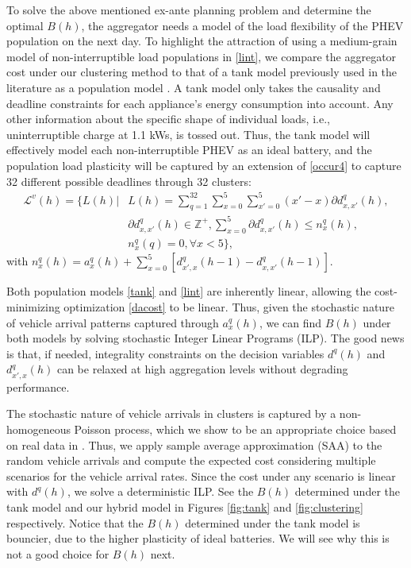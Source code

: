 \documentclass[10pt]{IEEEtran}
\begin{document}
To solve the above mentioned ex-ante planning problem and determine the optimal $B(h)$, the aggregator needs a model of the load flexibility of the PHEV population on the next day.
To highlight the attraction of using a medium-grain model of non-interruptible load populations in \eqref{lint}, we compare the aggregator cost under our clustering method to that of a  tank model previously used in the literature as a population model \cite{homer, 6426102,ortega}. A tank model only takes the causality and deadline constraints for each appliance's energy consumption into account. Any other information about the specific shape of individual loads, i.e., uninterruptible charge at 1.1 kWs, is tossed out. Thus, the tank model will effectively model each non-interruptible PHEV as an ideal battery, and the population load plasticity will be captured by an extension of \eqref{occur4} to capture 32 different possible deadlines through 32 clusters:
  \begin{align} 
{\mathcal L}^v(h) = \Big\{L(h)|&  L(h) = \sum_{q=1}^{32} \sum_{x=0}^{5} \sum_{x'=0}^{5}(x'-x)\partial d^q_{x,x'}(h),\nonumber\\ &\partial d_{x,x'}^q(h) \in \mathbb{Z}^+,\!\! \sum_{x=0}^{5}\partial d_{x,x'}^q(h)\leq n^q_x(h),\nonumber \\&  n_x^q(q) = 0, \forall x < 5\Big\},\label{tank}
\end{align}
with
$n_{x}^q(h)=  a^q_x(h) + \sum_{x=0}^{5} [d^q_{x',x}(h-1)- d^q_{x,x'}(h-1)]
$.

Both population models \eqref{tank} and \eqref{lint} are inherently linear, allowing the cost-minimizing optimization \eqref{dacost} to be linear. Thus, given the stochastic nature of vehicle arrival patterns captured through $a^q_x(h)$, we can find $B(h)$ under both models by solving stochastic Integer Linear Programs (ILP). The good news is that, if needed, integrality constraints on the decision variables $d^q(h)$ and $d^q_{x',x}(h)$ can be relaxed at high aggregation levels without degrading performance. 



The stochastic nature of vehicle arrivals in clusters is captured by a non-homogeneous Poisson process, which we show to be an appropriate choice based on real data in \cite{alizadeh2013ev}. Thus, we apply sample average approximation (SAA) to the random vehicle arrivals and compute the expected cost considering multiple scenarios for the vehicle arrival rates. Since the cost under any scenario is linear with $d^q(h)$, we solve a deterministic ILP. See the $B(h)$ determined under the tank model and our hybrid model in Figures  \ref{fig:tank} and \ref{fig:clustering} respectively. Notice that the $B(h)$ determined under the tank model is bouncier, due to the higher plasticity of ideal batteries. We will see why this is not a good choice for $B(h)$ next.
\end{document}
